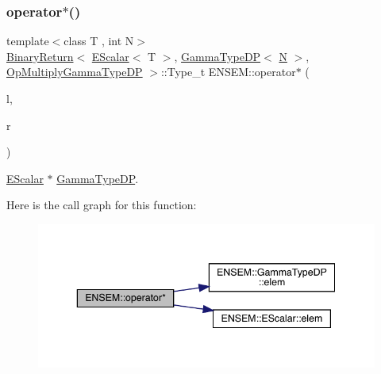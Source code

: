 \subsubsection{\texorpdfstring{operator$\ast$()}{operator*()}\hspace{0.1cm}{\footnotesize\ttfamily [9/9]}}
{\footnotesize\ttfamily template$<$class T , int N$>$ \\
\mbox{\hyperlink{structENSEM_1_1BinaryReturn}{Binary\+Return}}$<$ \mbox{\hyperlink{classENSEM_1_1EScalar}{E\+Scalar}}$<$ T $>$, \mbox{\hyperlink{classENSEM_1_1GammaTypeDP}{Gamma\+Type\+DP}}$<$ \mbox{\hyperlink{adat__devel_2lib_2hadron_2operator__name__util_8cc_a7722c8ecbb62d99aee7ce68b1752f337}{N}} $>$, \mbox{\hyperlink{structENSEM_1_1OpMultiplyGammaTypeDP}{Op\+Multiply\+Gamma\+Type\+DP}} $>$\+::Type\+\_\+t E\+N\+S\+E\+M\+::operator$\ast$ (\begin{DoxyParamCaption}\item[{const \mbox{\hyperlink{classENSEM_1_1EScalar}{E\+Scalar}}$<$ T $>$ \&}]{l,  }\item[{const \mbox{\hyperlink{classENSEM_1_1GammaTypeDP}{Gamma\+Type\+DP}}$<$ \mbox{\hyperlink{adat__devel_2lib_2hadron_2operator__name__util_8cc_a7722c8ecbb62d99aee7ce68b1752f337}{N}} $>$ \&}]{r }\end{DoxyParamCaption})\hspace{0.3cm}{\ttfamily [inline]}}



\mbox{\hyperlink{classENSEM_1_1EScalar}{E\+Scalar}} $\ast$ \mbox{\hyperlink{classENSEM_1_1GammaTypeDP}{Gamma\+Type\+DP}}. 

Here is the call graph for this function\+:
\nopagebreak
\begin{figure}[H]
\begin{center}
\leavevmode
\includegraphics[width=343pt]{d4/dca/group__escalar_ga546f1e55f2e4eda7a887fbf4fcaa177f_cgraph}
\end{center}
\end{figure}
\mbox{\label{group__escalar_ga45a6583b8f7490b2e54b5c88ff07ba94}} 
